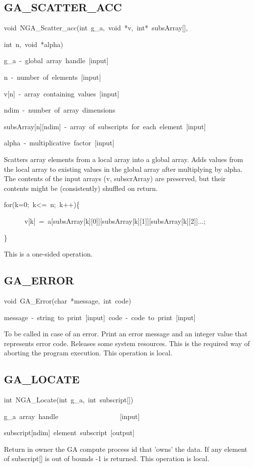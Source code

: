\subsection*{\label{sub:GA_SCATTER_ACC}GA\_SCATTER\_ACC}
\begin{lyxcode}
void~NGA\_Scatter\_acc(int~g\_a,~void~{*}v,~int{*}~subsArray{[}{]},

int~n,~void~{*}alpha)



g\_a~-~global~array~handle~{[}input{]}~

n~-~number~of~elements~{[}input{]}~~

v{[}n{]}~-~array~containing~values~{[}input{]}~

ndim~-~number~of~array~dimensions~

subsArray{[}n{]}{[}ndim{]}~-~array~of~subscripts~for~each~element~{[}input{]}

alpha~-~multiplicative~factor~{[}input{]}
\end{lyxcode}
Scatters array elements from a local array into a global array. Adds
values from the local array to existing values in the global array
after multiplying by alpha. The contents of the input arrays (v, subscrArray)
are preserved, but their contents might be (consistently) shuffled
on return.
\begin{lyxcode}
for(k=0;~k<=~n;~k++)\{

~~~~~~v{[}k{]}~=~a{[}subsArray{[}k{]}{[}0{]}{]}{[}subsArray{[}k{]}{[}1{]}{]}{[}subsArray{[}k{]}{[}2{]}{]}...;~

\}
\end{lyxcode}
This is a one-sided operation.


\subsection*{\label{sub:GA_ERROR}GA\_ERROR}
\begin{lyxcode}
void~GA\_Error(char~{*}message,~int~code)



message~-~string~to~print~{[}input{]}~code~-~code~to~print~{[}input{]}
\end{lyxcode}
To be called in case of an error. Print an error message and an integer
value that represents error code. Releases some system resources.
This is the required way of aborting the program execution. This operation
is local. 


\subsection*{\label{sub:GA_LOCATE}GA\_LOCATE}
\begin{lyxcode}
int~NGA\_Locate(int~g\_a,~int~subscript{[}{]})



g\_a~array~handle~~~~~~~~~~~~~~~~~~{[}input{]}~

subscript{[}ndim{]}~element~subscript~{[}output{]}
\end{lyxcode}
Return in owner the GA compute process id that 'owns' the data. If
any element of subscript{[}{]} is out of bounds \textquotedbl{}-1\textquotedbl{}
is returned. This operation is local.


